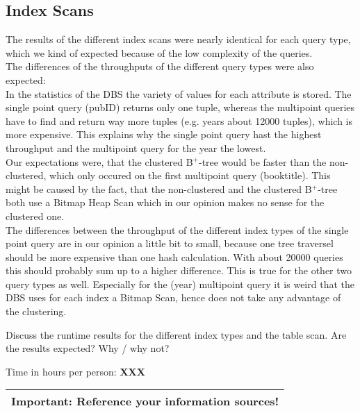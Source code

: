 \documentclass[11pt]{scrartcl}
\begin{document}
\subsection{Index Scans}
The results of the different index scans were nearly identical for each query type, which we kind of expected because of the low complexity of the queries.\\
The differences of the throughputs of the different query types were also expected:\\
In the statistics of the DBS the variety of values for each attribute is stored. The single point query (pubID) returns only one tuple, whereas the multipoint queries have to find and return way more tuples (e.g. years about 12000 tuples), which is more expensive. This explains why the single point query hast the highest throughput and the multipoint query for the year the lowest.\\
Our expectations were, that the clustered B$^+$-tree would be faster than the non-clustered, which only occured on the first multipoint query (booktitle). This might be caused by the fact, that the non-clustered and the clustered B$^+$-tree both use a Bitmap Heap Scan which in our opinion makes no sense for the clustered one.\\
The differences between the throughput of the different index types of the single point query are in our opinion a little bit to small, because one tree traversel should be more expensive than one hash calculation. With about 20000 queries this should probably sum up to a higher difference. This is true for the other two query types as well. Especially for the (year) multipoint query it is weird that the DBS uses for each index a Bitmap Scan, hence does not take any advantage of the clustering.

Discuss the runtime results for the different index types and the
table scan. Are the results expected? Why / why not?


\bigskip

\noindent Time in hours per person: {\bf XXX}

\bigskip

\begin{center}
  \begin{tabular}{c}
    \hline
    {\bf Important:} Reference your information sources!
    \\\hline
  \end{tabular}
\end{center}
\end{document}
